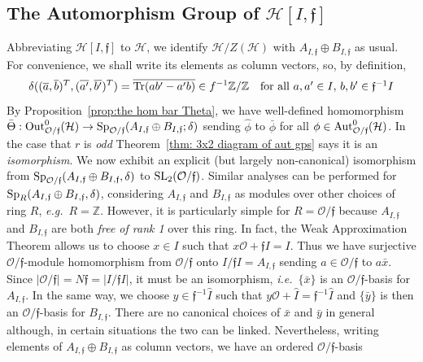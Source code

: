 \documentclass[12pt]{article}
\newcommand{\addwords}[1]{\ \ \ \mbox{#1}}
\newcommand{\Aut}{{\rm Aut}}
\newcommand{\bbZ}{\ensuremath{\mathbb{Z}}}
\newcommand{\cH}{\ensuremath{\mathcal{H}}}
\newcommand{\cO}{\ensuremath{\mathcal{O}}}
\newcommand{\eg}{\emph{e.g.}}
\newcommand{\ff}{\ensuremath{\mathfrak{f}}}
\newcommand{\ie}{{\em i.e.}}
\newcommand{\inv}{^{-1}}%
\newcommand{\Out}{{\rm Out}}
\newcommand{\SL}{{\rm SL}}
\newcommand{\Tr}{{\rm Tr}}
\newcommand{\Zunder}[1]{#1 \inv\bbZ/\bbZ}
\newcommand{\AIdsB}{\ensuremath{A_{I,\ff}\oplus B_{I,\ff}}}
\newcommand{\Of}{{\cO/\ff}}
\begin{document}
\subsection{The Automorphism Group of $\cH[I,\ff]$}
Abbreviating $\cH[I,\ff]$ to $\cH$, we identify $\cH/Z(\cH)$ with $A_{I,\ff}\oplus B_{I,\ff}$ as usual. 
For convenience, we shall write its elements as column vectors, so, by definition,  
\begin{equation}\label{eq:def delta now}
	\delta((\overline{a}, \overline{b})^T,(\overline{a'},\overline{b'})^T)=
	\overline{\Tr(ab'-a'b)}\in \Zunder{f}
	\addwords{for all $a,a'\in I$, $b,b'\in \ff\inv I$}
\end{equation}
By Proposition~\ref{prop:the hom bar Theta}, we have well-defined homomorphism 
$\bar\Theta:\Out^0_{\Of}(\cH)\rightarrow{\rm Sp}_{\Of}(A_{I,\ff}\oplus B_{I,\ff};\delta)$ sending $\hat\phi$ to $\bar \phi$ for all $\phi\in\Aut^0_\Of(\cH)$. In the case 
that $r$ is \textit{odd} Theorem~\ref{thm: 3x2 diagram of aut gps} says it is an \textit{isomorphism}. 
We now exhibit an explicit (but largely non-canonical)
 isomorphism from ${\rm Sp}_{\Of}(A_{I,\ff}\oplus B_{I,\ff},\delta)$ to 
 $\SL_2(\Of)$. 
 Similar analyses can be performed for ${\rm Sp}_R(A_{I,\ff}\oplus 
 B_{I,\ff},\delta)$, considering $A_{I,\ff}$ and $B_{I,\ff}$ as modules over other choices of ring $R$, \eg\  $R=\bbZ$. However, it is particularly simple for $R=\Of$ 
because  $A_{I,\ff}$ and $B_{I,\ff}$ are both \textit{free of rank 1} over this ring. 
In fact, the Weak Approximation Theorem allows us to choose $x\in I$ such that $x\cO+\ff I=I$. Thus we have surjective $\Of$-module homomorphism from $\Of$ onto $I/\ff I=A_{I,\ff}$ sending $a\in\Of$ to $a\bar x$. Since $|\Of|=N\ff=|I/\ff I|$, it must be an isomorphism, \ie\  $\{\bar x\}$ is an $\Of$-basis  for $A_{I,\ff}$. In the same way, we choose $y\in \ff\inv \hat I$ such that $y\cO+\hat I=\ff\inv \hat I$ and $\{\bar y\}$ is then an $\Of$-basis for $B_{I,\ff}$. There are no canonical choices of $\bar x$ and $\bar y$ in general although, in certain situations the two can be linked. 
Nevertheless, writing elements of $\AIdsB$ as column vectors, we have an ordered $\Of$-basis  
\end{document}
